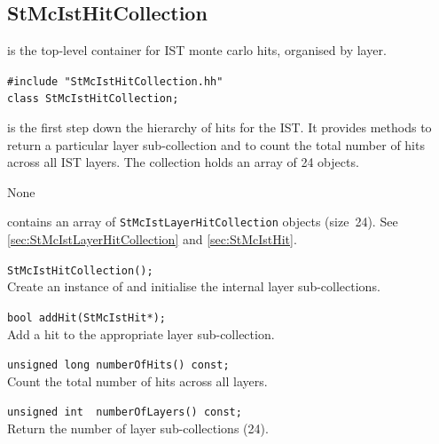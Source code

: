 \subsection{StMcIstHitCollection}
 
\label{sec:StMcIstHitCollection}
\begin{Entry}
\item[Summary]
     is the top-level container for IST monte
    carlo hits, organised by layer.

\item[Synopsis]
    \verb+#include "StMcIstHitCollection.hh"+\\
    \verb+class StMcIstHitCollection;+\\

\item[Description]
     is the first step down the hierarchy of hits
    for the IST.  It provides methods to return a particular layer
    sub-collection and to count the total number of hits across all IST layers.
    The collection holds an array of 24 
    objects.

\item[Persistence]
    None

\item[Related Classes]
     contains an array of
    {\tt StMcIstLayerHitCollection} objects (size~24).  See
     \ref{sec:StMcIstLayerHitCollection}
    and  \ref{sec:StMcIstHit}.

\item[Public\\ Constructors]
    \verb+StMcIstHitCollection();+\\
    Create an instance of  and
    initialise the internal layer sub-collections.

\item[Public Member\\ Functions]

    \verb+bool addHit(StMcIstHit*);+\\
    Add a hit to the appropriate layer sub-collection.

    \verb+unsigned long numberOfHits() const;+\\
    Count the total number of hits across all layers.

    \verb+unsigned int  numberOfLayers() const;+\\
    Return the number of layer sub-collections (24).


\end{Entry}
